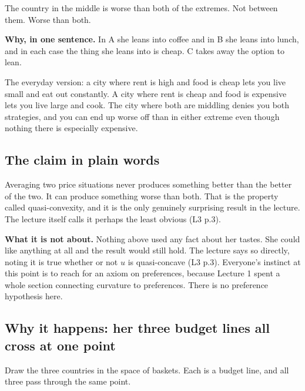 \documentclass[11pt,letterpaper]{article}
\theoremstyle{definition}
\theoremstyle{plain}
\newcommand{\src}[1]{{\small\textsf{(#1)}}}
\begin{document}
The country in the middle is worse than both of the extremes. Not between them. Worse than both.

\textbf{Why, in one sentence.} In A she leans into coffee and in B she leans into lunch, and in each
case the thing she leans into is cheap. C takes away the option to lean.

The everyday version: a city where rent is high and food is cheap lets you live small and eat out
constantly. A city where rent is cheap and food is expensive lets you live large and cook. The city
where both are middling denies you both strategies, and you can end up worse off than in either
extreme even though nothing there is especially expensive.

\subsection{The claim in plain words}

Averaging two price situations never produces something better than the better of the two. It can
produce something worse than both. That is the property called quasi-convexity, and it is the only
genuinely surprising result in the lecture. The lecture itself calls it perhaps the least obvious
\src{L3 p.3}.

\textbf{What it is not about.} Nothing above used any fact about her tastes. She could like anything
at all and the result would still hold. The lecture says so directly, noting it is true whether or
not $u$ is quasi-concave \src{L3 p.3}. Everyone's instinct at this point is to reach for an axiom
on preferences, because Lecture 1 spent a whole section connecting curvature to preferences. There is
no preference hypothesis here.

\subsection{Why it happens: her three budget lines all cross at one point}

Draw the three countries in the space of baskets. Each is a budget line, and all three pass through
the same point.
\end{document}
